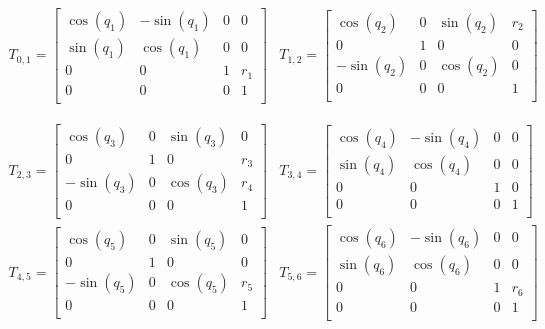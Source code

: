 \documentclass{article}
\begin{document}
\[
\begin{array}{cc}
T_{0,1} =
\begin{bmatrix}
  \cos(q_1) & -\sin(q_1) & 0 & 0 \\
  \sin(q_1) & \cos(q_1) & 0 & 0 \\
  0 & 0 & 1 & r_1 \\
  0 & 0 & 0 & 1 \\

\end{bmatrix}

&

T_{1,2} =
\begin{bmatrix}
  \cos(q_2) & 0 & \sin(q_2) & r_2 \\
  0 & 1 & 0 & 0 \\
  -\sin(q_2) & 0 & \cos(q_2) & 0 \\
  0 & 0 & 0 & 1 \\

\end{bmatrix}
\end{array}
\]

\[
\begin{array}{cc}
T_{2,3} =
\begin{bmatrix}
  \cos(q_3) & 0 & \sin(q_3) & 0 \\
  0 & 1 & 0 & r_3 \\
  -\sin(q_3) & 0 & \cos(q_3) & r_4 \\
  0 & 0 & 0 & 1 \\

\end{bmatrix}
&
T_{3,4} =
\begin{bmatrix}
  \cos(q_4) & -\sin(q_4) & 0 & 0 \\
  \sin(q_4) & \cos(q_4) & 0 & 0 \\
  0 & 0 & 1 & 0 \\
  0 & 0 & 0 & 1 \\

\end{bmatrix}
\end{array}
\]
\[
\begin{array}{cc}
T_{4,5} =
\begin{bmatrix}
  \cos(q_5) & 0 & \sin(q_5) & 0 \\
  0 & 1 & 0 & 0 \\
  -\sin(q_5) & 0 & \cos(q_5) & r_5 \\
  0 & 0 & 0 & 1 \\

\end{bmatrix}

&

T_{5,6} =
\begin{bmatrix}
  \cos(q_6) & -\sin(q_6) & 0 & 0 \\
  \sin(q_6) & \cos(q_6) & 0 & 0\\
  0 & 0 & 1 & r_6\\
  0 & 0 & 0 & 1\\

\end{bmatrix}
\end{array}
\]
\end{document}
